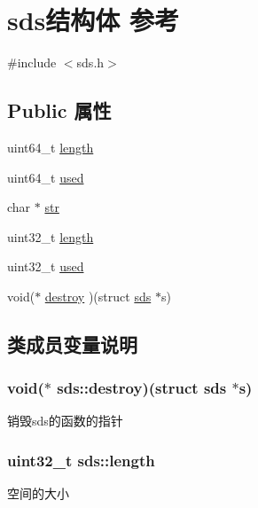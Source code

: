 \hypertarget{structsds}{}\section{sds结构体 参考}
\label{structsds}


{\ttfamily \#include $<$sds.\+h$>$}

\subsection*{Public 属性}
\begin{DoxyCompactItemize}
\item 
uint64\+\_\+t \hyperlink{structsds_a333f14feb33f9719162f37377629716a}{length}
\item 
uint64\+\_\+t \hyperlink{structsds_a5d733da962855ed70322d900c51eb65f}{used}
\item 
char $\ast$ \hyperlink{structsds_a3c48d440195e1e20c013334cd8dc3884}{str}
\item 
uint32\+\_\+t \hyperlink{structsds_a333f14feb33f9719162f37377629716a}{length}
\item 
uint32\+\_\+t \hyperlink{structsds_a5d733da962855ed70322d900c51eb65f}{used}
\item 
void($\ast$ \hyperlink{structsds_aa104dfaab4d63ee5b1b5c436d3aca364}{destroy} )(struct \hyperlink{structsds}{sds} $\ast$s)
\end{DoxyCompactItemize}


\subsection{类成员变量说明}
\subsubsection[{\texorpdfstring{destroy}{destroy}}]{\setlength{\rightskip}{0pt plus 5cm}void($\ast$ sds\+::destroy)(struct {\bf sds} $\ast$s)}\hypertarget{structsds_aa104dfaab4d63ee5b1b5c436d3aca364}{}\label{structsds_aa104dfaab4d63ee5b1b5c436d3aca364}
销毁sds的函数的指针 
\subsubsection[{\texorpdfstring{length}{length}}]{\setlength{\rightskip}{0pt plus 5cm}uint32\+\_\+t sds\+::length}\hypertarget{structsds_a333f14feb33f9719162f37377629716a}{}\label{structsds_a333f14feb33f9719162f37377629716a}
空间的大小 
